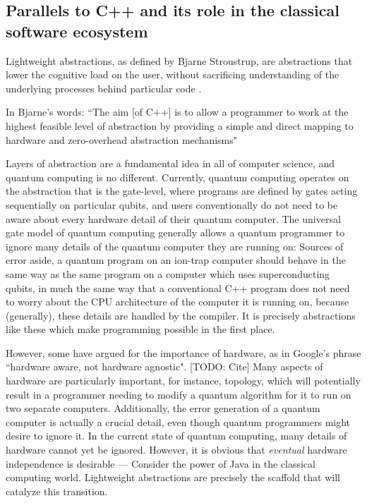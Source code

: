 \documentclass[a4paper,twocolumn,11pt,accepted=2017-05-09]{quantumarticle}
\begin{document}
\subsection{Parallels to C++ and its role in the classical software ecosystem}

Lightweight abstractions, as defined by Bjarne Stroustrup, are abstractions that lower the cognitive load on the user, without sacrificing understanding of the underlying processes behind particular code \cite{stroustrup}.

In Bjarne's words:
``The aim [of C++] is to allow a programmer to work at the highest feasible level of abstraction by providing a simple and direct mapping to hardware and zero-overhead abstraction mechanisms"

Layers of abstraction are a fundamental idea in all of computer science, and quantum computing is no different.
Currently, quantum computing operates on the abstraction that is the gate-level, where programs are defined by gates acting sequentially on particular qubits, and users conventionally do not need to be aware about every hardware detail of their quantum computer.
The universal gate model of quantum computing generally allows a quantum programmer to ignore many details of the quantum computer they are running on: Sources of error aside, a quantum program on an ion-trap computer should behave in the same way as the same program on a computer which uses superconducting qubits, in much the same way that a conventional C++ program does not need to worry about the CPU architecture of the computer it is running on, because (generally), these details are
handled by the compiler.
It is precisely abstractions like these which make programming possible in the first place.

However, some have argued for the importance of hardware, as in Google's phrase ``hardware aware, not hardware agnostic". [TODO: Cite]
Many aspects of hardware are particularly important, for instance, topology, which will potentially result in a programmer needing to modify a quantum algorithm for it to run on two separate computers.
Additionally, the error generation of a quantum computer is actually a crucial detail, even though quantum programmers might desire to ignore it.
In the current state of quantum computing, many details of hardware cannot yet be ignored. 
However, it is obvious that \emph{eventual} hardware independence is desirable --- Consider the power of Java in the classical computing world. Lightweight abstractions are precisely the scaffold that will catalyze this transition.
\end{document}
